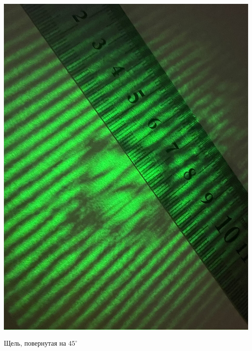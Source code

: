 \documentclass[12pt,a4paper]{article}
\begin{document}
\begin{minipage}{0.47\textwidth}
\begin{center}
\includegraphics[width = \textwidth]{src/45.jpeg}
\end{center}

\begin{center}
Щель, повернутая на $45^{\circ}$
\end{center}
\end{minipage}
\end{document}
